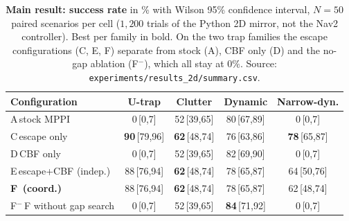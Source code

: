 \begin{table}[t]
\centering
\caption{\textbf{Main result: success rate} in \% with Wilson 95\% confidence interval, $N=50$ paired scenarios per cell ($1{,}200$ trials of the Python 2D mirror, not the Nav2 controller). Best per family in bold. On the two trap families the escape configurations (C, E, F) separate from stock (A), CBF only (D) and the no-gap ablation (F$^{-}$), which all stay at $0\%$. Source: \texttt{experiments/results\_2d/summary.csv}.}
\label{tab:main}
\small
\begin{tabular}{lcccc}
\toprule
Configuration & U-trap & Clutter & Dynamic & Narrow-dyn. \\
\midrule
A\,stock MPPI & 0\,{\scriptsize[0,7]} & 52\,{\scriptsize[39,65]} & 80\,{\scriptsize[67,89]} & 0\,{\scriptsize[0,7]} \\
C\,escape only & \textbf{90}\,{\scriptsize[79,96]} & \textbf{62}\,{\scriptsize[48,74]} & 76\,{\scriptsize[63,86]} & \textbf{78}\,{\scriptsize[65,87]} \\
D\,CBF only & 0\,{\scriptsize[0,7]} & 52\,{\scriptsize[39,65]} & 82\,{\scriptsize[69,90]} & 0\,{\scriptsize[0,7]} \\
E\,escape+CBF (indep.) & 88\,{\scriptsize[76,94]} & \textbf{62}\,{\scriptsize[48,74]} & 78\,{\scriptsize[65,87]} & 64\,{\scriptsize[50,76]} \\
\textbf{F\,\sname{} (coord.)} & 88\,{\scriptsize[76,94]} & \textbf{62}\,{\scriptsize[48,74]} & 78\,{\scriptsize[65,87]} & 62\,{\scriptsize[48,74]} \\
F$^{-}$\,F without gap search & 0\,{\scriptsize[0,7]} & 52\,{\scriptsize[39,65]} & \textbf{84}\,{\scriptsize[71,92]} & 0\,{\scriptsize[0,7]} \\
\bottomrule
\end{tabular}
\end{table}
